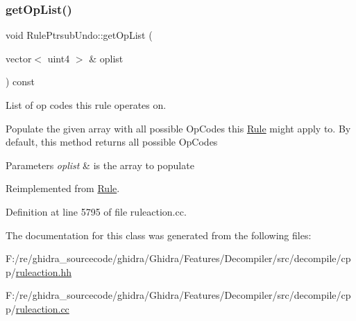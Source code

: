 \subsubsection{\texorpdfstring{getOpList()}{getOpList()}}
{\footnotesize\ttfamily void Rule\+Ptrsub\+Undo\+::get\+Op\+List (\begin{DoxyParamCaption}\item[{vector$<$ uint4 $>$ \&}]{oplist }\end{DoxyParamCaption}) const\hspace{0.3cm}{\ttfamily [virtual]}}



List of op codes this rule operates on. 

Populate the given array with all possible Op\+Codes this \mbox{\hyperlink{class_rule}{Rule}} might apply to. By default, this method returns all possible Op\+Codes 
\begin{DoxyParams}{Parameters}
{\em oplist} & is the array to populate \\
\hline
\end{DoxyParams}


Reimplemented from \mbox{\hyperlink{class_rule_a4023bfc7825de0ab866790551856d10e}{Rule}}.



Definition at line 5795 of file ruleaction.\+cc.



The documentation for this class was generated from the following files\+:\begin{DoxyCompactItemize}
\item 
F\+:/re/ghidra\+\_\+sourcecode/ghidra/\+Ghidra/\+Features/\+Decompiler/src/decompile/cpp/\mbox{\hyperlink{ruleaction_8hh}{ruleaction.\+hh}}\item 
F\+:/re/ghidra\+\_\+sourcecode/ghidra/\+Ghidra/\+Features/\+Decompiler/src/decompile/cpp/\mbox{\hyperlink{ruleaction_8cc}{ruleaction.\+cc}}\end{DoxyCompactItemize}
